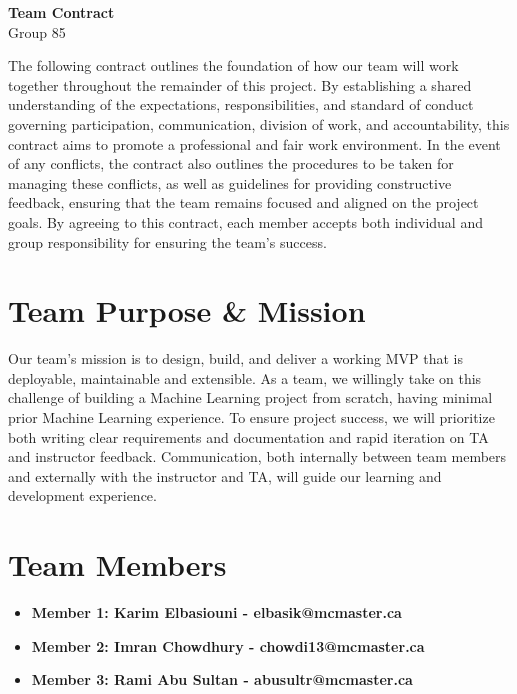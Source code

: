 \documentclass[12pt]{article}
\begin{document}
\begin{center}
  {\Large\bfseries Team Contract}\\[10pt]
  {\normalsize Group 85}
\end{center}

The following contract outlines the foundation of how our team will work together throughout the remainder of this project. By establishing a shared understanding of the expectations, responsibilities, and standard of conduct governing participation, communication, division of work, and accountability, 
this contract aims to promote a professional and fair work environment. In the event of any conflicts, the contract also outlines the procedures to be taken for managing these conflicts, as well as guidelines for providing constructive feedback, ensuring that the team remains focused and aligned on the project goals. 
By agreeing to this contract, each member accepts both individual and group responsibility for ensuring the team's success.  

\section*{Team Purpose \& Mission}
Our team's mission is to design, build, and deliver a working MVP that is deployable, maintainable and extensible. As a team, we willingly take on this challenge of building a Machine Learning project from scratch, having minimal prior Machine Learning experience. To ensure project success,
we will prioritize both writing clear requirements and documentation and rapid iteration on TA and instructor feedback. Communication, both internally between team members and externally with the instructor and TA, will guide our learning and development experience.

\section*{Team Members}
\begin{itemize}
  \item \textbf{Member 1: Karim Elbasiouni - elbasik@mcmaster.ca} 
  \item \textbf{Member 2: Imran Chowdhury - chowdi13@mcmaster.ca} 
  \item \textbf{Member 3: Rami Abu Sultan - abusultr@mcmaster.ca} 
\end{itemize}
\end{document}
